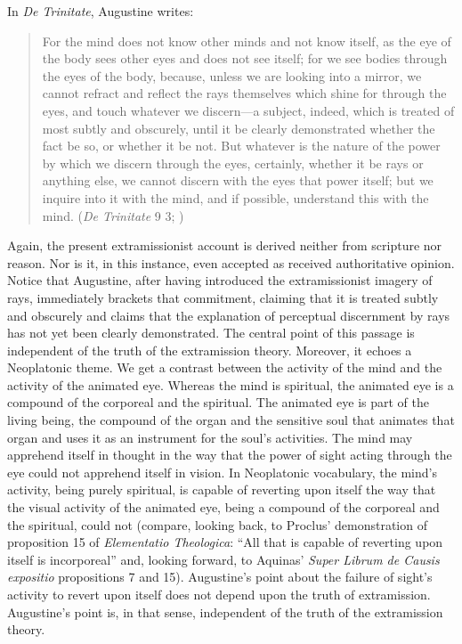 \documentclass[12pt]{article}
\begin{document}
In \emph{De Trinitate}, Augustine writes:
\begin{quote}
	For the mind does not know other minds and not know itself, as the eye of the body sees other eyes and does not see itself; for we see bodies through the eyes of the body, because, unless we are looking into a mirror, we cannot refract and reflect the rays themselves which shine for through the eyes, and touch whatever we discern---a subject, indeed, which is treated of most subtly and obscurely, until it be clearly demonstrated whether the fact be so, or whether it be not. But whatever is the nature of the power by which we discern through the eyes, certainly, whether it be rays or anything else, we cannot discern with the eyes that power itself; but we inquire into it with the mind, and if possible, understand this with the mind. (\emph{De Trinitate} 9 3; \citealt[226]{Haddan:1873aa})
\end{quote}
Again, the present extramissionist account is derived neither from scripture nor reason. Nor is it, in this instance, even accepted as received authoritative opinion. Notice that Augustine, after having introduced the extramissionist imagery of rays, immediately brackets that commitment, claiming that it is treated subtly and obscurely and claims that the explanation of perceptual discernment by rays has not yet been clearly demonstrated. The central point of this passage is independent of the truth of the extramission theory. Moreover, it echoes a Neoplatonic theme. We get a contrast between the activity of the mind and the activity of the animated eye. Whereas the mind is spiritual, the animated eye is a compound of the corporeal and the spiritual. The animated eye is part of the living being, the compound of the organ and the sensitive soul that animates that organ and uses it as an instrument for the soul's activities. The mind may apprehend itself in thought in the way that the power of sight acting through the eye could not apprehend itself in vision.  In Neoplatonic vocabulary, the mind's activity, being purely spiritual, is capable of reverting upon itself the way that the visual activity of the animated eye, being a compound of the corporeal and the spiritual, could not (compare, looking back, to Proclus' demonstration of proposition 15 of \emph{Elementatio Theologica}: “All that is capable of reverting upon itself is incorporeal” and, looking forward, to Aquinas' \emph{Super Librum de Causis expositio} propositions 7 and 15). Augustine's point about the failure of sight's activity to revert upon itself does not depend upon the truth of extramission. Augustine's point is, in that sense, independent of the truth of the extramission theory.
\end{document}
